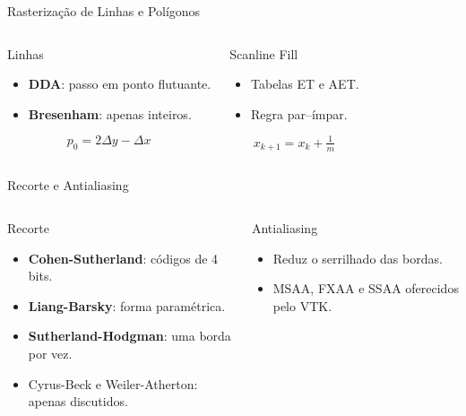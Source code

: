 \documentclass[aspectratio=169,11pt]{beamer}
\begin{document}
\begin{frame}{Rasterização de Linhas e Polígonos}
\begin{columns}[T,onlytextwidth]
\begin{block}{Linhas}
\begin{itemize}
  \item \textbf{DDA}: passo em ponto flutuante.
  \item \textbf{Bresenham}: apenas inteiros.
\end{itemize}
\[ p_0 = 2\Delta y - \Delta x \]
\end{block}
\begin{block}{Scanline Fill}
\begin{itemize}
  \item Tabelas ET e AET.
  \item Regra par--ímpar.
\end{itemize}
\[ x_{k+1}=x_k+\tfrac{1}{m} \]
\end{block}
\end{columns}
\end{frame}

\begin{frame}{Recorte e Antialiasing}
\begin{columns}[T,onlytextwidth]
\begin{block}{Recorte}
\begin{itemize}
  \item \textbf{Cohen-Sutherland}: códigos de 4 bits.
  \item \textbf{Liang-Barsky}: forma paramétrica.
  \item \textbf{Sutherland-Hodgman}: uma borda por vez.
  \item Cyrus-Beck e Weiler-Atherton: apenas discutidos.
\end{itemize}
\end{block}
\begin{block}{Antialiasing}
\begin{itemize}
  \item Reduz o serrilhado das bordas.
  \item MSAA, FXAA e SSAA oferecidos pelo VTK.
\end{itemize}
\end{block}
\end{columns}
\end{frame}

\end{document}
